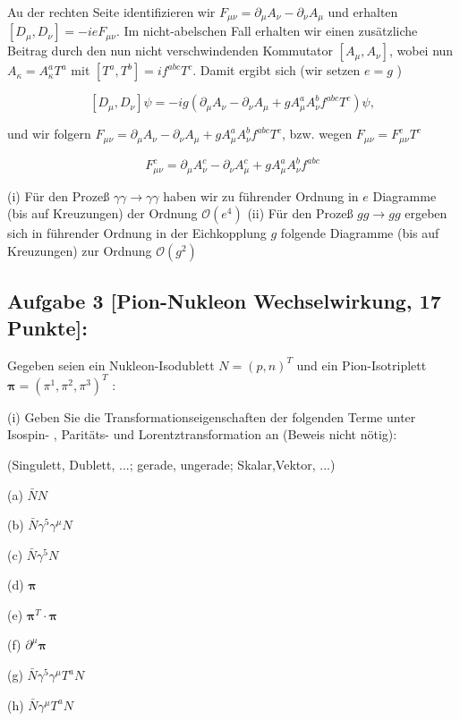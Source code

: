 \documentclass[10pt, letterpaper]{article}
\begin{document}
Au der rechten Seite identifizieren wir $F_{\mu \nu}=\partial_\mu A_\nu-\partial_\nu A_\mu$ und erhalten $\left[D_\mu, D_\nu\right]=-i e F_{\mu \nu}$. Im nicht-abelschen Fall erhalten wir einen zusätzliche Beitrag durch den nun nicht verschwindenden Kommutator $\left[A_\mu, A_\nu\right]$, wobei nun $A_\kappa=A_\kappa^a T^a$ mit $\left[T^a, T^b\right]=i f^{a b c} T^c$. Damit ergibt sich (wir setzen $e=g$ )

$$
\left[D_\mu, D_\nu\right] \psi=-i g\left(\partial_\mu A_\nu-\partial_\nu A_\mu+g A_\mu^a A_\nu^b f^{a b c} T^c\right) \psi,
$$

und wir folgern $F_{\mu \nu}=\partial_\mu A_\nu-\partial_\nu A_\mu+g A_\mu^a A_\nu^b f^{a b c} T^c$, bzw. wegen $F_{\mu \nu}=F_{\mu \nu}^c T^c$

$$
F_{\mu \nu}^c=\partial_\mu A_\nu^c-\partial_\nu A_\mu^c+g A_\mu^a A_\nu^b f^{a b c}
$$

(i) Für den Prozeß $\gamma \gamma \rightarrow \gamma \gamma$ haben wir zu führender Ordnung in $e$ Diagramme (bis auf Kreuzungen) der Ordnung $\mathcal{O}\left(e^4\right)$
(ii) Für den Prozeß $g g \rightarrow g g$ ergeben sich in führender Ordnung in der Eichkopplung $g$ folgende Diagramme (bis auf Kreuzungen) zur Ordnung $\mathcal{O}\left(g^2\right)$


\subsection{Aufgabe 3 [Pion-Nukleon Wechselwirkung, 17 Punkte]:}

Gegeben seien ein Nukleon-Isodublett $N=(p, n)^T$ und ein Pion-Isotriplett $\boldsymbol{\pi}=\left(\pi^1, \pi^2, \pi^3\right)^T$ :

(i) Geben Sie die Transformationseigenschaften der folgenden Terme unter Isospin- , Paritäts- und Lorentztransformation an (Beweis nicht nötig):

(Singulett, Dublett, ...; gerade, ungerade; Skalar,Vektor, ...)

(a) $\bar{N} N$

(b) $\bar{N} \gamma^5 \gamma^\mu N$

(c) $\bar{N} \gamma^5 N$

(d) $\boldsymbol{\pi}$

(e) $\boldsymbol{\pi}^T \cdot \boldsymbol{\pi}$

(f) $\partial^\mu \boldsymbol{\pi}$

(g) $\bar{N} \gamma^5 \gamma^\mu T^a N$

(h) $\bar{N} \gamma^\mu T^a N$
\end{document}
